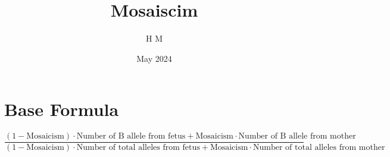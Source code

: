 \documentclass{article}
\title{Mosaiscim}
\author{H M}
\date{May 2024}
\begin{document}
\maketitle

\section{Base Formula}

\[\frac{(1 - \text{Mosaicism}) \cdot \text{Number of B allele from fetus} + \text{Mosaicism} \cdot \text{Number of B allele from mother}}{(1 - \text{Mosaicism}) \cdot \text{Number of total alleles from fetus} + \text{Mosaicism} \cdot \text{Number of total alleles from mother}}\]
\end{document}
